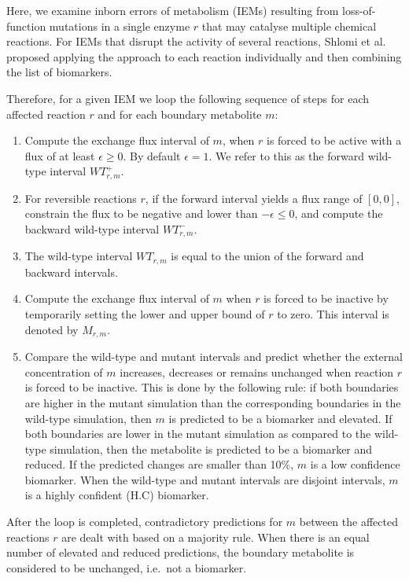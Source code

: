 \documentclass[10pt,a4paper,onecolumn]{article}
\newcommand{\tightlist}{%
  \setlength{\itemsep}{1pt}\setlength{\parskip}{0pt}\setlength{\parsep}{0pt}}
\begin{document}
Here, we examine inborn errors of metabolism (IEMs) resulting from
loss-of-function mutations in a single enzyme \(r\) that may catalyse
multiple chemical reactions. For IEMs that disrupt the activity of
several reactions, Shlomi et al. proposed applying the approach to each
reaction individually and then combining the list of biomarkers.

Therefore, for a given IEM we loop the following sequence of steps for
each affected reaction \(r\) and for each boundary metabolite \(m\):

\begin{enumerate}
\def\labelenumi{\arabic{enumi}.}
\tightlist
\item
  Compute the exchange flux interval of \(m\), when \(r\) is forced to
  be active with a flux of at least \(\epsilon \geq 0\). By default
  \(\epsilon = 1\). We refer to this as the forward wild-type interval
  \(WT_{r,m}^+\).
\item
  For reversible reactions \(r\), if the forward interval yields a flux
  range of \([0,0]\), constrain the flux to be negative and lower than
  \(-\epsilon \leq 0\), and compute the backward wild-type interval
  \(WT_{r,m}^-\).
\item
  The wild-type interval \(WT_{r,m}\) is equal to the union of the
  forward and backward intervals.\\
\item
  Compute the exchange flux interval of \(m\) when \(r\) is forced to be
  inactive by temporarily setting the lower and upper bound of \(r\) to
  zero. This interval is denoted by \(M_{r,m}\).
\item
  Compare the wild-type and mutant intervals and predict whether the
  external concentration of \(m\) increases, decreases or remains
  unchanged when reaction \(r\) is forced to be inactive. This is done
  by the following rule: if both boundaries are higher in the mutant
  simulation than the corresponding boundaries in the wild-type
  simulation, then \(m\) is predicted to be a biomarker and elevated. If
  both boundaries are lower in the mutant simulation as compared to the
  wild-type simulation, then the metabolite is predicted to be a
  biomarker and reduced. If the predicted changes are smaller than 10\%,
  \(m\) is a low confidence biomarker. When the wild-type and mutant
  intervals are disjoint intervals, \(m\) is a highly confident (H.C)
  biomarker.
\end{enumerate}

After the loop is completed, contradictory predictions for \(m\) between
the affected reactions \(r\) are dealt with based on a majority rule.
When there is an equal number of elevated and reduced predictions, the
boundary metabolite is considered to be unchanged, i.e.~not a biomarker.
\end{document}
